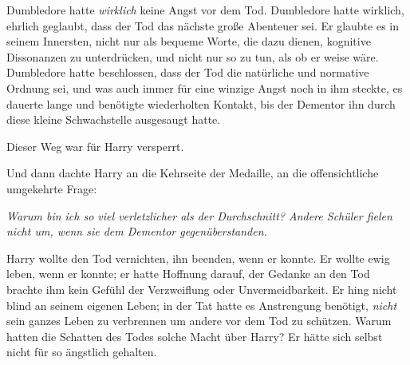 Dumbledore hatte \emph{wirklich} keine Angst vor dem Tod. Dumbledore hatte wirklich, ehrlich geglaubt, dass der Tod das nächste große Abenteuer sei. Er glaubte es in seinem Innersten, nicht nur als bequeme Worte, die dazu dienen, kognitive Dissonanzen zu unterdrücken, und nicht nur so zu tun, als ob er weise wäre. Dumbledore hatte beschlossen, dass der Tod die natürliche und normative Ordnung sei, und was auch immer für eine winzige Angst noch in ihm steckte, es dauerte lange und benötigte wiederholten Kontakt, bis der Dementor ihn durch diese kleine Schwachstelle ausgesaugt hatte.

Dieser Weg war für Harry versperrt.

Und dann dachte Harry an die Kehrseite der Medaille, an die offensichtliche umgekehrte Frage:

\emph{Warum bin ich so viel verletzlicher als der Durchschnitt? Andere Schüler fielen nicht um, wenn sie dem Dementor gegenüberstanden.}

Harry wollte den Tod vernichten, ihn beenden, wenn er konnte. Er wollte ewig leben, wenn er konnte; er hatte Hoffnung darauf, der Gedanke an den Tod brachte ihm kein Gefühl der Verzweiflung oder Unvermeidbarkeit. Er hing nicht blind an seinem eigenen Leben; in der Tat hatte es Anstrengung benötigt, \emph{nicht} sein ganzes Leben zu verbrennen um andere vor dem Tod zu schützen. Warum hatten die Schatten des Todes solche Macht über Harry? Er hätte sich selbst nicht für so ängstlich gehalten.

